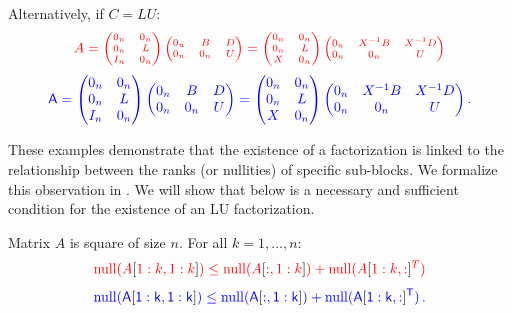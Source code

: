 \documentclass[10pt,twoside]{siamart1116}
\DeclareMathOperator{\nl}{null}
\numberwithin{theorem}{section}
\providecommand{\DIFadd}[1]{{\protect\color{blue} \sf #1}} %
\providecommand{\DIFdel}[1]{{\protect\color{red} \scriptsize #1}} %
\providecommand{\DIFaddbegin}{} %
\providecommand{\DIFaddend}{} %
\providecommand{\DIFdelbegin}{} %
\providecommand{\DIFdelend}{} %
\begin{document}
Alternatively, if $C = LU$:
\DIFdelbegin \[
	\DIFdel{A =
	\begin{pmatrix}
		0_n & 0_n \\
		0_n & L   \\
		I_n & 0_n
	\end{pmatrix}
	\begin{pmatrix}
		0_n & B   & D \\
		0_n & 0_n & U
	\end{pmatrix}
	=
	\begin{pmatrix}
		0_n & 0_n \\
		0_n & L   \\
		X   & 0_n
	\end{pmatrix}
	\begin{pmatrix}
		0_n & X^{-1} B & X^{-1} D \\
		0_n & 0_n      & U
	\end{pmatrix}
}\]%
\DIFdelend \DIFaddbegin \[
  \DIFadd{A =
  \begin{pmatrix}
    0_n & 0_n \\
    0_n & L   \\
    I_n & 0_n
  \end{pmatrix}
  \begin{pmatrix}
    0_n & B   & D \\
    0_n & 0_n & U
  \end{pmatrix}
  =
  \begin{pmatrix}
    0_n & 0_n \\
    0_n & L   \\
    X   & 0_n
  \end{pmatrix}
  \begin{pmatrix}
    0_n & X^{-1} B & X^{-1} D \\
    0_n & 0_n      & U
  \end{pmatrix}.
}\]\DIFaddend 

These examples demonstrate that the existence of a factorization is linked to the relationship between the ranks (or nullities) of specific sub-blocks. We formalize this observation in . We will show that  below is a necessary and sufficient condition for the existence of an LU factorization.

\begin{property}\label{prop:rank}
  Matrix $A$ is square of size $n$. For all $k = 1, \ldots, n$:
  \DIFdelbegin \begin{displaymath}
		\DIFdel{%
		\nl(A}[\DIFdel{1:k,1:k}]\DIFdel{) \le \nl(A}[\DIFdel{:,1:k}]\DIFdel{) + \nl(}{\DIFdel{A}[\DIFdel{1:k,:}]}\DIFdel{^T)
	}\end{displaymath}%
\DIFdelend \DIFaddbegin \begin{equation}
    \DIFadd{\label{eq:cond1}
    \nl(A}[\DIFadd{1:k,1:k}]\DIFadd{) \le \nl(A}[\DIFadd{:,1:k}]\DIFadd{) + \nl(}{\DIFadd{A}[\DIFadd{1:k,:}]}\DIFadd{^T) \,.
  }\end{equation}\DIFaddend 
\end{property}
\end{document}
